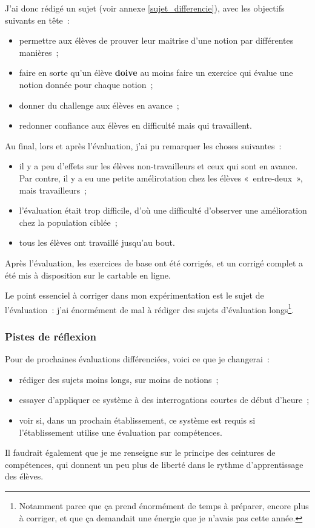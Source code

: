 J'ai donc rédigé un sujet (voir annexe \ref{sujet_differencie}), avec les objectifs suivants
en tête :

\begin{itemize}
    \item permettre aux élèves de prouver leur maitrise d'une notion par différentes manières ;
    \item faire en sorte qu'un élève \textbf{doive} au moins faire un exercice qui évalue une notion donnée pour chaque notion ;
    \item donner du challenge aux élèves en avance ;
    \item redonner confiance aux élèves en difficulté mais qui travaillent.
\end{itemize}

Au final, lors et après l'évaluation, j'ai pu remarquer les choses suivantes :
\begin{itemize}
    \item il y a peu d'effets sur les élèves non-travailleurs et ceux qui sont
    en avance. Par contre, il y a eu une petite amélirotation chez les élèves
    « entre-deux », mais travailleurs ;
    \item l'évaluation était trop difficile, d'où une difficulté d'observer une
    amélioration chez la population ciblée ;
    \item tous les élèves ont travaillé jusqu'au bout.
\end{itemize}

Après l'évaluation, les exercices de base ont été corrigés, et un corrigé complet
a été mis à disposition sur le cartable en ligne.

Le point essenciel à corriger dans mon expérimentation est le sujet de l'évaluation :
j'ai énormément de mal à rédiger des sujets d'évaluation longs\footnote{
Notamment parce que ça prend énormément de temps à préparer, encore plus à corriger,
et que ça demandait une énergie que je n'avais pas cette année.
}.

\subsubsection{Pistes de réflexion}

Pour de prochaines évaluations différenciées, voici ce que je changerai :
\begin{itemize}
    \item rédiger des sujets moins longs, sur moins de notions ;
    \item essayer d'appliquer ce système à des interrogations courtes de début d'heure ;
    \item voir si, dans un prochain établissement, ce système est requis si l'établissement
    utilise une évaluation par compétences.
\end{itemize}

Il faudrait également que je me renseigne sur le principe des ceintures de compétences,
qui donnent un peu plus de liberté dans le rythme d'apprentissage des élèves.
